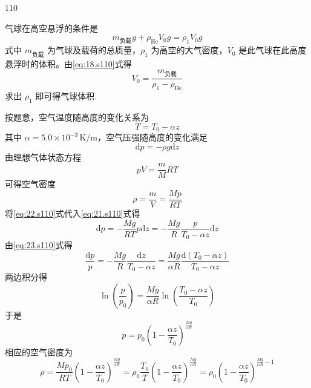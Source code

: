 \begin{solution}{110}
\begin{subsolution}
气球在高空悬浮的条件是
\begin{equation}
m_{\text{负载}} g + \rho_{\mathrm{He}} V_{0} g = \rho_{1} V_{0} g
\label{eq:18.s110}
\end{equation}
式中 $m_{\text{负载}}$ 为气球及载荷的总质量，$\rho_{1}$ 为高空的大气密度，$V_{0}$ 是此气球在此高度悬浮时的体积。由\eqref{eq:18.s110}式得
\begin{equation}
V_{0} = \frac{m_{\text{负载}}}{\rho_{1} - \rho_{\mathrm{He}}}
\label{eq:19.s110}
\end{equation}
求出 $\rho_{1}$ 即可得气球体积.

按题意，空气温度随高度的变化关系为
\begin{equation}
T = T_{0} - \alpha z
\label{eq:20.s110}
\end{equation}
其中 $\alpha = 5.0\times 10^{-3}\,\mathrm{K/m}$，空气压强随高度的变化满足
\begin{equation}
\mathrm{d}p = - \rho g \mathrm{d}z
\label{eq:21.s110}
\end{equation}
由理想气体状态方程
\[
p V = \frac{m}{M} R T
\]
可得空气密度
\begin{equation}
\rho = \frac{m}{V} = \frac{M p}{R T}
\label{eq:22.s110}
\end{equation}
将\eqref{eq:22.s110}式代入\eqref{eq:21.s110}式得
\begin{equation}
\mathrm{d}p = - \frac{M g}{R T} p \mathrm{d}z = - \frac{M g}{R} \frac{p}{T_{0} - \alpha z} \mathrm{d}z
\label{eq:23.s110}
\end{equation}
由\eqref{eq:23.s110}式得
\begin{equation}
\frac{\mathrm{d}p}{p} = - \frac{M g}{R} \frac{\mathrm{d}z}{T_{0} - \alpha z} = \frac{M g}{\alpha R} \frac{\mathrm{d}(T_{0} - \alpha z)}{T_{0} - \alpha z}
\label{eq:24.s110}
\end{equation}
两边积分得
\begin{equation}
\ln\left(\frac{p}{p_{0}}\right) = \frac{M g}{\alpha R} \ln\left(\frac{T_{0} - \alpha z}{T_{0}}\right)
\label{eq:25.s110}
\end{equation}
于是
\begin{equation}
p = p_{0} \left(1 - \frac{\alpha z}{T_{0}}\right)^{\frac{M g}{\alpha R}}
\label{eq:26.s110}
\end{equation}
相应的空气密度为
\begin{equation}
\rho = \frac{M p_{0}}{R T} \left(1 - \frac{\alpha z}{T_{0}}\right)^{\frac{M g}{\alpha R}} = \rho_{0} \frac{T_{0}}{T} \left(1 - \frac{\alpha z}{T_{0}}\right)^{\frac{M g}{\alpha R}} = \rho_{0} \left(1 - \frac{\alpha z}{T_{0}}\right)^{\frac{M g}{\alpha R} - 1}

\end{equation}
\end{subsolution}
\end{solution}

